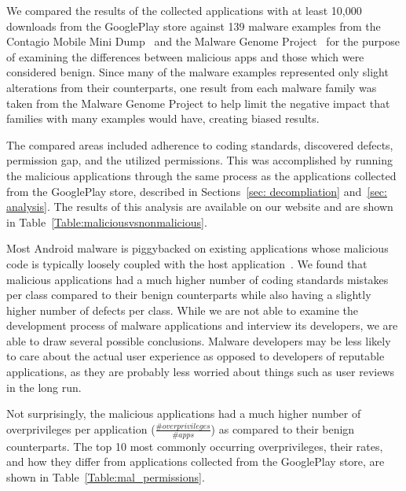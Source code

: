 \documentclass[conference]{IEEEtran}
\begin{document}
We compared the results of the collected applications with at least 10,000 downloads from the GooglePlay store against 139 malware examples from the Contagio Mobile Mini Dump~\cite{contagio_url} and the Malware Genome Project~\cite{Zhou:2012:DAM:2310656.2310710} for the purpose of examining the differences between malicious apps and those which were considered benign. Since many of the malware examples represented only slight alterations from their counterparts, one result from each malware family was taken from the Malware Genome Project to help limit the negative impact that families with many examples would have, creating biased results.

The compared areas included adherence to coding standards, discovered defects, permission gap, and the utilized permissions. This was accomplished by running the malicious applications through the same process as the applications collected from the GooglePlay store, described in Sections~\ref{sec: decompliation} and~\ref{sec: analysis}. The results of this analysis are available on our website and are shown in Table~\ref{Table:maliciousvsnonmalicious}.

Most Android malware is piggybacked on existing applications whose malicious code is typically loosely coupled with the host application~\cite{Zhou:2012:DAM:2310656.2310710, Deshotels:2014:DAF:2556464.2556467}. We found that malicious applications had a much higher number of coding standards mistakes per class compared to their benign counterparts while also having a slightly higher number of defects per class. While we are not able to examine the development process of malware applications and interview its developers, we are able to draw several possible conclusions. Malware developers may be less likely to care about the actual user experience as opposed to developers of reputable applications, as they are probably less worried about things such as user reviews in the long run. 


Not surprisingly, the malicious applications had a much higher number of overprivileges per application ($\frac{\#overprivileges}{\# apps} $) as compared to their benign counterparts. The top 10 most commonly occurring overprivileges, their rates, and how they differ from applications collected from the GooglePlay store, are shown in Table~\ref{Table:mal_permissions}.
\end{document}
